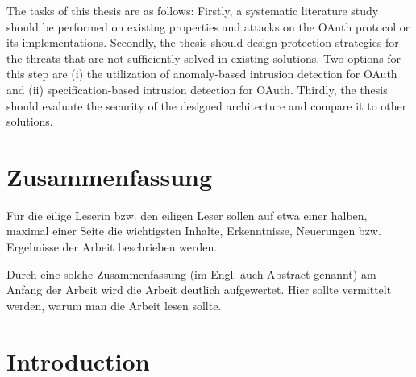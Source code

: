 \documentclass[
    fontsize=12pt,
    headings=small,
    parskip=half,           %
    bibliography=totoc,
    numbers=noenddot,       %
    open=any,               %
    ]{scrreprt}
\begin{document}
The tasks of this thesis are as follows: Firstly, a systematic literature study should be performed on existing properties and attacks on the OAuth protocol or its implementations. Secondly, the thesis should design protection strategies for the threats that are not sufficiently solved in existing solutions. Two options for this step are (i) the utilization of anomaly-based intrusion detection for OAuth and (ii) specification-based intrusion detection for OAuth. Thirdly, the thesis should evaluate the security of the designed architecture and compare it to other solutions.

\chapter*{Zusammenfassung}

Für die eilige Leserin bzw. den eiligen Leser sollen auf etwa einer halben, maximal einer Seite die wichtigsten Inhalte, Erkenntnisse, Neuerungen bzw. Ergebnisse der Arbeit beschrieben werden.

Durch eine solche Zusammenfassung (im Engl. auch Abstract genannt) am Anfang der Arbeit wird die Arbeit deutlich aufgewertet. Hier sollte vermittelt werden, warum man die Arbeit lesen sollte.

\tableofcontents

\chapter{Introduction}
\label{chap:introduction}
\end{document}
